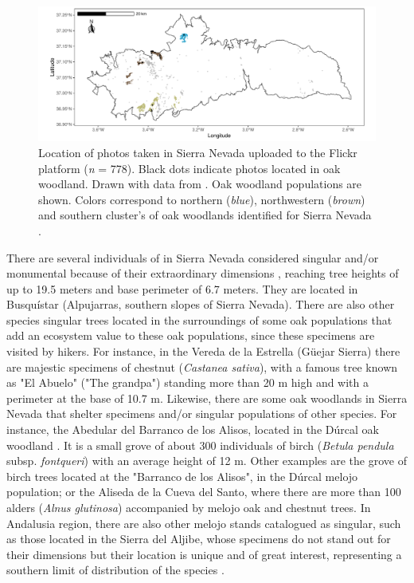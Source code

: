 \begin{figure}
    \centering
    \includegraphics[width=\textwidth]{img/es/es-flicker.pdf}\caption{Location of photos taken in Sierra Nevada uploaded to the Flickr platform (\emph{n} = 778). Black dots indicate photos located in oak woodland. Drawn with data from \citet{RosCandeiraetal2020SocialMedia}. Oak woodland populations are shown. Colors correspond to northern (\emph{blue}), northwestern (\emph{brown}) and southern cluster's of oak woodlands identified for Sierra Nevada \autocite{PerezLuqueetal2021EcologicalDiversity}.  
}\label{fig:es:flicker}
\end{figure}
 
There are several individuals of \Qp in Sierra Nevada considered singular and/or monumental because of their extraordinary dimensions \autocite{IruritaFernandezetal2003ArbolesArboledas}, reaching tree heights of up to 19.5 meters and base perimeter of 6.7 meters. They are located in Busquístar (Alpujarras, southern slopes of Sierra Nevada). There are also other species singular trees located in the surroundings of some oak populations that add an ecosystem value to these oak populations, since these specimens are visited by hikers. For instance, in the Vereda de la Estrella (Güejar Sierra) there are majestic specimens of chestnut (\emph{Castanea sativa}), with a famous tree known as "El Abuelo" ("The grandpa") standing more than 20 m high and with a perimeter at the base of 10.7 m. Likewise, there are some oak woodlands in Sierra Nevada that shelter specimens and/or singular populations of other species. For instance, the Abedular del Barranco de los Alisos, located in the Dúrcal oak woodland \autocites{MartinezLabargaetal1990AbedularRelictico}. It is a small grove of about 300 individuals of birch (\emph{Betula pendula} subsp. \emph{fontqueri}) with an average height of 12 m. Other examples are the grove of birch trees located at the "Barranco de los Alisos", in the Dúrcal melojo population; or the Aliseda de la Cueva del Santo, where there are more than 100 alders (\emph{Alnus glutinosa}) accompanied by melojo oak and chestnut trees. In Andalusia region, there are also other melojo stands catalogued as singular, such as those located in the Sierra del Aljibe, whose specimens do not stand out for their dimensions but their location is unique and of great interest, representing a southern limit of distribution of the species \autocite{SanchezGarciaetal2003ArbolesArboledas}. 

